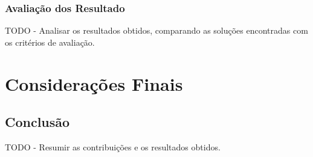 \documentclass[12pt, a4paper]{report}
\begin{document}
\subsection{Avaliação dos Resultado~}
TODO - Analisar os resultados obtidos, comparando as soluções encontradas com os critérios de avaliação.

\chapter{Considerações Finais}

\section{Conclusão}
TODO - Resumir as contribuições e os resultados obtidos.

\newpage
\renewcommand{\refname}{Referências Bibliográficas}

\nocite{*}
\end{document}

